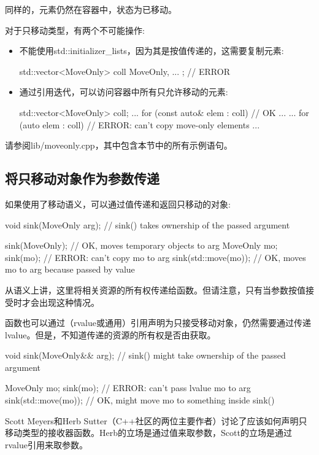 同样的，元素仍然在容器中，状态为已移动。

对于只移动类型，有两个不可能操作:

\begin{itemize}
\item 不能使用std::initializer_lists，因为其是按值传递的，这需要复制元素:
\begin{cppcode}
std::vector<MoveOnly> coll{ MoveOnly{}, ... }; // ERROR
\end{cppcode}
\item 通过引用迭代，可以访问容器中所有只允许移动的元素:
\begin{cppcode}
std::vector<MoveOnly> coll;
...
for (const auto& elem : coll) { // OK
	...
}
...
for (auto elem : coll) { // ERROR: can’t copy move-only elements
	...
}
\end{cppcode}
\end{itemize}

请参阅lib/moveonly.cpp，其中包含本节中的所有示例语句。

\subsection{将只移动对象作为参数传递}

如果使用了移动语义，可以通过值传递和返回只移动的对象:

\begin{cppcode}
void sink(MoveOnly arg); // sink() takes ownership of the passed argument

sink(MoveOnly{}); // OK, moves temporary objects to arg
MoveOnly mo;
sink(mo); // ERROR: can’t copy mo to arg
sink(std::move(mo)); // OK, moves mo to arg because passed by value
\end{cppcode}

从语义上讲，这里将相关资源的所有权传递给函数。但请注意，只有当参数按值接受时才会出现这种情况。

函数也可以通过（rvalue或通用）引用声明为只接受移动对象，仍然需要通过传递lvalue。但是，不知道传递的资源的所有权是否由获取。

\begin{cppcode}
void sink(MoveOnly&& arg); // sink() might take ownership of the passed argument

MoveOnly mo;
sink(mo); // ERROR: can’t pass lvalue mo to arg
sink(std::move(mo)); // OK, might move mo to something inside sink()
\end{cppcode}

Scott Meyers和Herb Sutter（C++社区的两位主要作者）讨论了应该如何声明只移动类型的接收器函数。Herb的立场是通过值来取参数，Scott的立场是通过rvalue引用来取参数。

